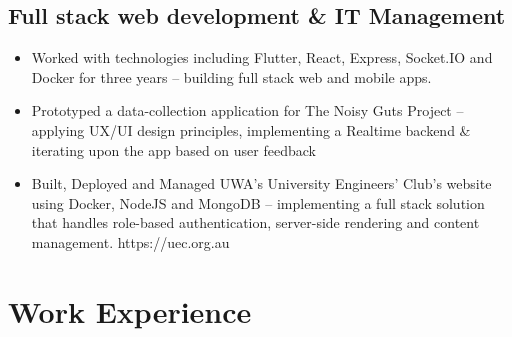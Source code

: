 \documentclass[a4page]{article}
\begin{document}
\begin{multicols}{2}
    \subsection{Full stack web development \& IT Management}
    \begin{itemize}
        \item Worked with technologies including Flutter, React, Express, Socket.IO and Docker for three years – building full stack web and mobile apps.
        \item Prototyped a data-collection application for The Noisy Guts Project – applying UX/UI design principles, implementing a Realtime backend \& iterating upon the app based on user feedback
        \item Built, Deployed and Managed UWA’s University Engineers’ Club’s website using Docker, NodeJS and MongoDB – implementing a full stack solution that handles role-based authentication, server-side rendering and content management. https://uec.org.au
    \end{itemize}
    \end{multicols}
    
    \section{Work Experience}
\end{document}
